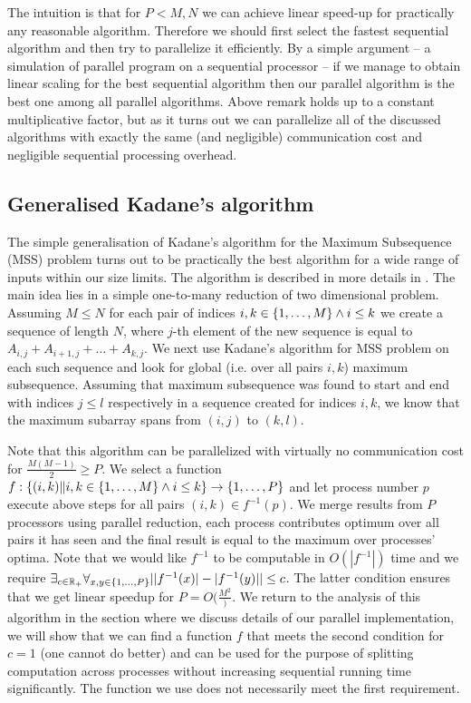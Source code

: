 The intuition is that for $P < M, N$ we can achieve linear speed-up for practically any reasonable algorithm.
Therefore we should first select the fastest sequential algorithm and then try to parallelize it efficiently.
By a simple argument -- a simulation of parallel program on a sequential processor -- if we manage to obtain linear scaling for the best sequential algorithm then our parallel algorithm is the best one among all parallel algorithms.
Above remark holds up to a constant multiplicative factor, but as it turns out we can parallelize all of the discussed algorithms with exactly the same (and negligible) communication cost and negligible sequential processing overhead.

\subsection*{Generalised Kadane's algorithm}

The simple generalisation of Kadane's algorithm for the Maximum Subsequence (MSS) problem turns out to be practically the best algorithm for a wide range of inputs within our size limits.
The algorithm is described in more details in \cite{Pearls}.
The main idea lies in a simple one-to-many reduction of two dimensional problem.
Assuming $M \leq N$ for each pair of indices $i, k \in \{ 1, \dots, M \} \land i \leq k$ we create a sequence of length $N$, where $j$-th element of the new sequence is equal to $A_{i,j} + A_{i+1,j} + \dots + A_{k,j}$.
We next use Kadane's algorithm for MSS problem on each such sequence and look for global (i.e. over all pairs $i, k$) maximum subsequence.
Assuming that maximum subsequence was found to start and end with indices $j \leq l$ respectively in a sequence created for indices $i, k$, we know that the maximum subarray spans from $(i, j)$ to $(k, l)$.

Note that this algorithm can be parallelized with virtually no communication cost for $\frac{M (M - 1)}{2} \geq P$.
We select a function $f : \{ (i, k) \| i, k \in \{ 1, \dots, M \} \land i \leq k \} \to \{ 1, \dots, P \}$ and let process number $p$ execute above steps for all pairs $(i, k) \in f^{-1}(p)$.
We merge results from $P$ processors using parallel reduction, each process contributes optimum over all pairs it has seen and the final result is equal to the maximum over processes' optima.
Note that we would like $f^{-1}$ to be computable in $O(|f^{-1}|)$ time and we require $\exists_{c \in \mathbb{R}_+}{\forall_{x, y \in \{ 1, \dots, P \}}{||f^{-1}(x)| - |f^{-1}(y)|| \leq c}}$.
The latter condition ensures that we get linear speedup for $P = O(\frac{M^2})$.
We return to the analysis of this algorithm in the section where we discuss details of our parallel implementation, we will show that we can find a function $f$ that meets the second condition for $c = 1$ (one cannot do better) and can be used for the purpose of splitting computation across processes without increasing sequential running time significantly.
The function we use does not necessarily meet the first requirement.

